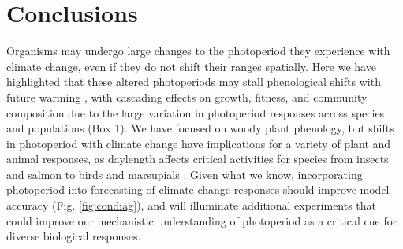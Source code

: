 \documentclass{article}
\begin{document}
\section*{Conclusions}
Organisms may undergo large changes to the photoperiod they experience with climate change, even if they do not shift their ranges spatially. Here we have highlighted that these altered photoperiods may stall phenological shifts with future warming \cite[e.g., Table S1,][]{fu2019, gusewell2017,yu2010}, with cascading effects on growth, fitness, and community composition due to the large variation in photoperiod responses across species and populations (Box 1). We have focused on woody plant phenology, but shifts in photoperiod with climate change have implications for a variety of plant and animal responses, as daylength affects critical activities for species from insects \citep{bradshaw2006} and salmon \citep{taranger2003} to birds \citep{dawson2001} and marsupials \citep{mcallan2006}. Given what we know, incorporating photoperiod into forecasting of climate change responses should improve model accuracy (Fig. \ref{fig:condiag}), and will illuminate additional experiments that could improve our mechanistic understanding of photoperiod as a critical cue for diverse biological responses. 
\end{document}
